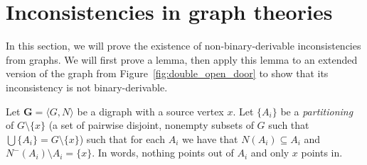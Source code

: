 \section{Inconsistencies in graph theories}
\label{sec:Inconsistencies in graph theories}
In this section, we will prove the existence of non-binary-derivable inconsistencies from graphs.
We will first prove a lemma, then apply this lemma to an extended version of the graph from Figure~\ref{fig:double_open_door} to show that its inconsistency is not binary-derivable.

Let $\mathbf{G} = \langle G,N \rangle$ be a digraph with a source vertex $x$.
Let $\{A_i\}$ be a \textit{partitioning} of $G \setminus \{ x \}$ (a set of pairwise disjoint, nonempty subsets of $G$ such that $\bigcup \{A_i\} = G \setminus \{ x \}$) such that for each $A_i$ we have that $N(A_i) \subseteq A_i$ and $N^-(A_i) \setminus A_i = \{ x \}$.
In words, nothing points out of $A_i$ and only $x$ points in.

